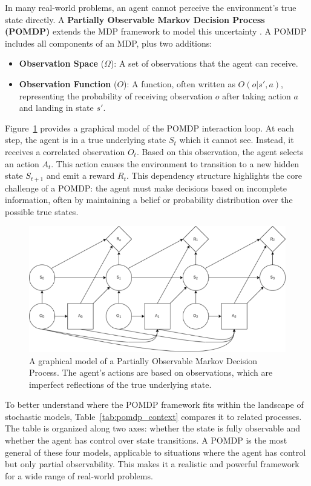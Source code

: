 \documentclass[../Main.tex]{subfiles}
\begin{document}
In many real-world problems, an agent cannot perceive the environment's true state directly. A \textbf{Partially Observable Markov Decision Process (POMDP)} extends the MDP framework to model this uncertainty \cite{cassandra1994acting}. A POMDP includes all components of an MDP, plus two additions:
\begin{itemize}
    \item \textbf{Observation Space} ($\Omega$): A set of observations that the agent can receive.
    \item \textbf{Observation Function} ($O$): A function, often written as $O(o|s',a)$, representing the probability of receiving observation $o$ after taking action $a$ and landing in state $s'$.
\end{itemize}

Figure~\ref{fig:pomdp-diagram} provides a graphical model of the POMDP interaction loop. At each step, the agent is in a true underlying state \(S_t\) which it cannot see. Instead, it receives a correlated observation \(O_t\). Based on this observation, the agent selects an action \(A_t\). This action causes the environment to transition to a new hidden state \(S_{t+1}\) and emit a reward \(R_t\). This dependency structure highlights the core challenge of a POMDP: the agent must make decisions based on incomplete information, often by maintaining a belief or probability distribution over the possible true states.

\begin{figure}[H]
    \centering
    \includegraphics[width=1\linewidth]{img/pomdp.png}
    \caption{A graphical model of a Partially Observable Markov Decision Process. The agent's actions are based on observations, which are imperfect reflections of the true underlying state.}
    \label{fig:pomdp-diagram}
\end{figure}

To better understand where the POMDP framework fits within the landscape of stochastic models, Table~\ref{tab:pomdp_context} compares it to related processes. The table is organized along two axes: whether the state is fully observable and whether the agent has control over state transitions. A POMDP is the most general of these four models, applicable to situations where the agent has control but only partial observability. This makes it a realistic and powerful framework for a wide range of real-world problems.
\end{document}
